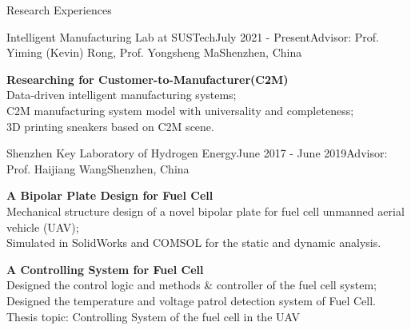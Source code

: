\documentclass{resume} %
\begin{document}
\begin{rSection}{Research Experiences}

    \begin{rSubsection}{Intelligent Manufacturing Lab at SUSTech}{July 2021 - Present}{Advisor: Prof. Yiming (Kevin) Rong, Prof. Yongsheng Ma}{Shenzhen, China}
    \vspace{-4pt}
    \item \textbf{Researching for Customer-to-Manufacturer(C2M) } \\
    Data-driven intelligent manufacturing systems;\\
    C2M manufacturing system model with universality and completeness;\\
    3D printing sneakers based on C2M scene.
    \end{rSubsection}
    
    
    \begin{rSubsection}{Shenzhen Key Laboratory of Hydrogen Energy}{June 2017 - June 2019}{Advisor: Prof. Haijiang Wang}{Shenzhen, China}
    \vspace{-4pt}
    \item \textbf{A Bipolar Plate Design for Fuel Cell} \\
    Mechanical structure design of a novel bipolar plate for fuel cell unmanned aerial vehicle (UAV);\\
    Simulated in SolidWorks and COMSOL for the static and dynamic analysis.

    \item \textbf{A Controlling System for Fuel Cell}\\ 
    Designed the control logic and methods \& controller of the fuel cell system; \\
    Designed the temperature and voltage patrol detection system of Fuel Cell.\\
    Thesis topic: Controlling System of the fuel cell in the UAV


\end{rSubsection}
\end{rSection}
\end{document}
